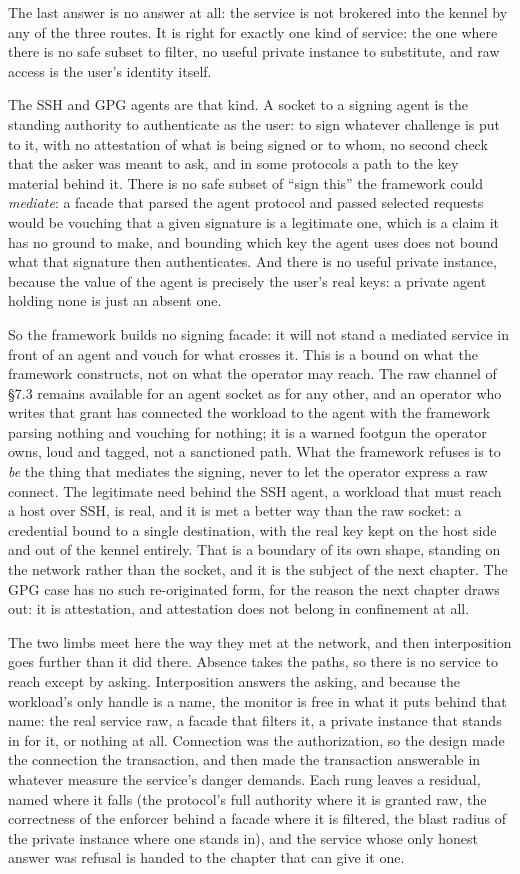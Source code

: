The last answer is no answer at all: the service is not brokered into
the kennel by any of the three routes. It is right for exactly one kind
of service: the one where there is no safe subset to filter, no useful
private instance to substitute, and raw access is the user's identity
itself.

The SSH and GPG agents are that kind. A socket to a signing agent is the
standing authority to authenticate as the user: to sign whatever
challenge is put to it, with no attestation of what is being signed or
to whom, no second check that the asker was meant to ask, and in some
protocols a path to the key material behind it. There is no safe subset
of ``sign this'' the framework could \emph{mediate}: a facade that
parsed the agent protocol and passed selected requests would be vouching
that a given signature is a legitimate one, which is a claim it has no
ground to make, and bounding which key the agent uses does not bound
what that signature then authenticates. And there is no useful private
instance, because the value of the agent is precisely the user's real
keys: a private agent holding none is just an absent one.

So the framework builds no signing facade: it will not stand a mediated
service in front of an agent and vouch for what crosses it. This is a
bound on what the framework constructs, not on what the operator may
reach. The raw channel of §7.3 remains available for an agent socket as
for any other, and an operator who writes that grant has connected the
workload to the agent with the framework parsing nothing and vouching
for nothing; it is a warned footgun the operator owns, loud and tagged,
not a sanctioned path. What the framework refuses is to \emph{be} the
thing that mediates the signing, never to let the operator express a raw
connect. The legitimate need behind the SSH agent, a workload that must
reach a host over SSH, is real, and it is met a better way than the raw
socket: a credential bound to a single destination, with the real key
kept on the host side and out of the kennel entirely. That is a boundary
of its own shape, standing on the network rather than the socket, and it
is the subject of the next chapter. The GPG case has no such
re-originated form, for the reason the next chapter draws out: it is
attestation, and attestation does not belong in confinement at all.

The two limbs meet here the way they met at the network, and then
interposition goes further than it did there. Absence takes the paths,
so there is no service to reach except by asking. Interposition answers
the asking, and because the workload's only handle is a name, the
monitor is free in what it puts behind that name: the real service raw,
a facade that filters it, a private instance that stands in for it, or
nothing at all. Connection was the authorization, so the design made the
connection the transaction, and then made the transaction answerable in
whatever measure the service's danger demands. Each rung leaves a
residual, named where it falls (the protocol's full authority where it
is granted raw, the correctness of the enforcer behind a facade where it
is filtered, the blast radius of the private instance where one stands
in), and the service whose only honest answer was refusal is handed to
the chapter that can give it one.
